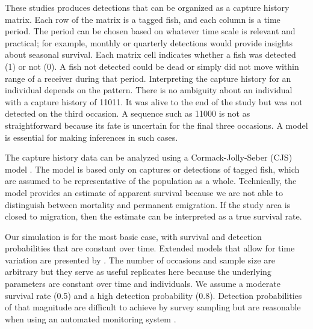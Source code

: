 \documentclass[
]{krantz}
\begin{document}
These studies produces detections that can be organized as a capture history matrix. Each row of the matrix is a tagged fish, and each column is a time period. The period can be chosen based on whatever time scale is relevant and practical; for example, monthly or quarterly detections would provide insights about seasonal survival. Each matrix cell indicates whether a fish was detected (1) or not (0). A fish not detected could be dead or simply did not move within range of a receiver during that period. Interpreting the capture history for an individual depends on the pattern. There is no ambiguity about an individual with a capture history of 11011. It was alive to the end of the study but was not detected on the third occasion. A sequence such as 11000 is not as straightforward because its fate is uncertain for the final three occasions. A model is essential for making inferences in such cases.

The capture history data can be analyzed using a Cormack-Jolly-Seber (CJS) model \citep{kéry.schaub_2011}. The model is based only on captures or detections of tagged fish, which are assumed to be representative of the population as a whole. Technically, the model provides an estimate of apparent survival because we are not able to distinguish between mortality and permanent emigration. If the study area is closed to migration, then the estimate can be interpreted as a true survival rate.

Our simulation is for the most basic case, with survival and detection probabilities that are constant over time. Extended models that allow for time variation are presented by \citet{kéry.schaub_2011}. The number of occasions and sample size are arbitrary but they serve as useful replicates here because the underlying parameters are constant over time and individuals. We assume a moderate survival rate (0.5) and a high detection probability (0.8). Detection probabilities of that magnitude are difficult to achieve by survey sampling but are reasonable when using an automated monitoring system \citep{hewitt.etal2010}.
\end{document}
